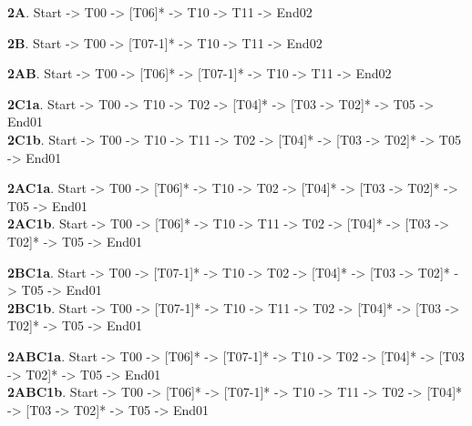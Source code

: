\documentclass[]{article}
\begin{document}
\textbf{2A}. Start -\textgreater{} T00 -\textgreater{} {[}T06{]}*
-\textgreater{} T10 -\textgreater{} T11 -\textgreater{} End02

\textbf{2B}. Start -\textgreater{} T00 -\textgreater{} {[}T07-1{]}*
-\textgreater{} T10 -\textgreater{} T11 -\textgreater{} End02

\textbf{2AB}. Start -\textgreater{} T00 -\textgreater{} {[}T06{]}*
-\textgreater{} {[}T07-1{]}* -\textgreater{} T10 -\textgreater{} T11
-\textgreater{} End02

\textbf{2C1a}. Start -\textgreater{} T00 -\textgreater{} T10
-\textgreater{} T02 -\textgreater{} {[}T04{]}* -\textgreater{} {[}T03
-\textgreater{} T02{]}* -\textgreater{} T05 -\textgreater{}
End01\\\textbf{2C1b}. Start -\textgreater{} T00 -\textgreater{} T10
-\textgreater{} T11 -\textgreater{} T02 -\textgreater{} {[}T04{]}*
-\textgreater{} {[}T03 -\textgreater{} T02{]}* -\textgreater{} T05
-\textgreater{} End01

\textbf{2AC1a}. Start -\textgreater{} T00 -\textgreater{} {[}T06{]}*
-\textgreater{} T10 -\textgreater{} T02 -\textgreater{} {[}T04{]}*
-\textgreater{} {[}T03 -\textgreater{} T02{]}* -\textgreater{} T05
-\textgreater{} End01\\\textbf{2AC1b}. Start -\textgreater{} T00
-\textgreater{} {[}T06{]}* -\textgreater{} T10 -\textgreater{} T11
-\textgreater{} T02 -\textgreater{} {[}T04{]}* -\textgreater{} {[}T03
-\textgreater{} T02{]}* -\textgreater{} T05 -\textgreater{} End01

\textbf{2BC1a}. Start -\textgreater{} T00 -\textgreater{} {[}T07-1{]}*
-\textgreater{} T10 -\textgreater{} T02 -\textgreater{} {[}T04{]}*
-\textgreater{} {[}T03 -\textgreater{} T02{]}* -\textgreater{} T05
-\textgreater{} End01\\\textbf{2BC1b}. Start -\textgreater{} T00
-\textgreater{} {[}T07-1{]}* -\textgreater{} T10 -\textgreater{} T11
-\textgreater{} T02 -\textgreater{} {[}T04{]}* -\textgreater{} {[}T03
-\textgreater{} T02{]}* -\textgreater{} T05 -\textgreater{} End01

\textbf{2ABC1a}. Start -\textgreater{} T00 -\textgreater{} {[}T06{]}*
-\textgreater{} {[}T07-1{]}* -\textgreater{} T10 -\textgreater{} T02
-\textgreater{} {[}T04{]}* -\textgreater{} {[}T03 -\textgreater{}
T02{]}* -\textgreater{} T05 -\textgreater{} End01\\\textbf{2ABC1b}.
Start -\textgreater{} T00 -\textgreater{} {[}T06{]}* -\textgreater{}
{[}T07-1{]}* -\textgreater{} T10 -\textgreater{} T11 -\textgreater{} T02
-\textgreater{} {[}T04{]}* -\textgreater{} {[}T03 -\textgreater{}
T02{]}* -\textgreater{} T05 -\textgreater{} End01
\end{document}
